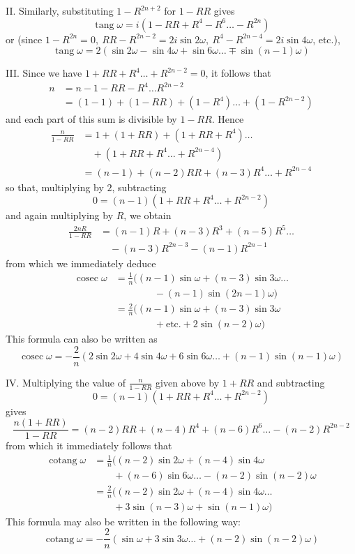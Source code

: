II. Similarly, substituting \(1-R^{2n+2}\) for \(1-RR\) gives
\[\operatorname{tang}\omega=i(1-RR+R^4-R^6\ldots-R^{2n})\] or (since \(1-R^{2n}=0,\allowbreak \ RR-R^{2n-2}=2i\sin2\omega,\allowbreak \ R^4-R^{2n-4}=2i\sin4\omega\), etc.), \[\operatorname{tang}\omega=2(\sin2\omega-\sin4\omega+\sin6\omega\ldots\mp\sin(n-1)\omega)\]

III. Since we have \(1+RR+R^4\ldots+R^{2n-2}=0\), it follows that \[\begin{aligned}n&=n-1-RR-R^4\ldots R^{2n-2}\\&=(1-1)+(1-RR)+(1-R^4)\ldots+(1-R^{2n-2})\end{aligned}\] and each part of this sum is divisible by \(1-RR\). Hence \[\begin{aligned}\frac n{1-RR}&=1+(1+RR)+(1+RR+R^4)\ldots\\&\quad+(1+RR+R^4\ldots+R^{2n-4})\\&=(n-1)+(n-2)RR+(n-3)R^4\ldots+R^{2n-4}\end{aligned}\] so that, multiplying by \(2\), subtracting \[0=(n-1)(1+RR+R^4\ldots+R^{2n-2})\] and again multiplying by \(R\), we obtain \[\begin{aligned}\frac{2nR}{1-RR}&=(n-1)R+(n-3)R^3+(n-5)R^5\ldots\\&\quad-(n-3)R^{2n-3}-(n-1)R^{2n-1}\end{aligned}\] from which we immediately deduce \[\begin{aligned}\operatorname{cosec}\omega&=\frac1n\bigl((n-1)\sin\omega+(n-3)\sin3\omega\ldots\\&\qquad\qquad-(n-1)\sin(2n-1)\omega\bigr)\\&=\frac2n\bigl((n-1)\sin\omega+(n-3)\sin3\omega\\&\qquad\qquad+\text{etc.}+2\sin(n-2)\omega\bigr)\end{aligned}\] This formula can also be written as \[\operatorname{cosec}\omega=-\frac2n(2\sin2\omega+4\sin4\omega+6\sin6\omega\ldots+(n-1)\sin(n-1)\omega)\]

IV. Multiplying the value of \(\frac n{1-RR}\) given above by \(1+RR\) and subtracting \[0=(n-1)(1+RR+R^4\ldots+R^{2n-2})\] gives \[\frac{n(1+RR)}{1-RR}=(n-2)RR+(n-4)R^4+(n-6)R^6\ldots-(n-2)R^{2n-2}\]
from which it immediately follows that \[\begin{aligned}\operatorname{cotang}\omega&=\frac1n\bigl((n-2)\sin2\omega+(n-4)\sin4\omega\\&\qquad+(n-6)\sin6\omega\ldots-(n-2)\sin(n-2)\omega\\&=\frac2n((n-2)\sin2\omega+(n-4)\sin4\omega\ldots\\&\qquad+3\sin(n-3)\omega+\sin(n-1)\omega)\end{aligned}\] This formula may also be written in the following way: \[\operatorname{cotang}\omega=-\frac2n(\sin\omega+3\sin3\omega\ldots+(n-2)\sin(n-2)\omega)\]\endgroup


